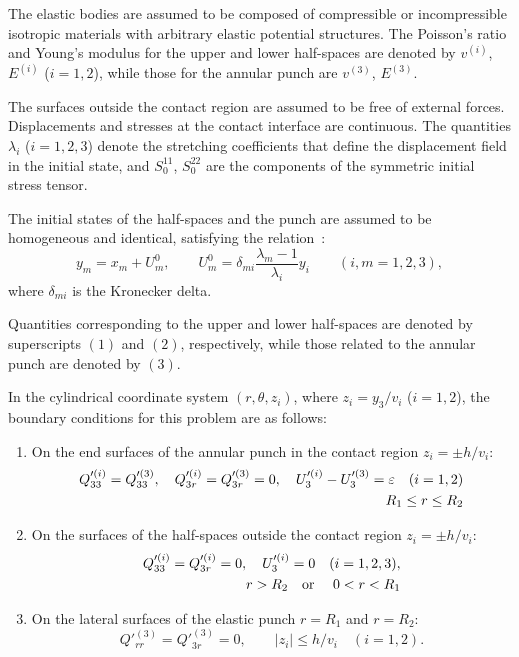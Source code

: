 The elastic bodies are assumed to be composed of compressible or incompressible isotropic materials with arbitrary elastic potential structures. The Poisson's ratio and Young's modulus for the upper and lower half-spaces are denoted by $v^{(i)}$, $E^{(i)}$ ($i=1,2$), while those for the annular punch are $v^{(3)}$, $E^{(3)}$.

The surfaces outside the contact region are assumed to be free of external forces. Displacements and stresses at the contact interface are continuous. The quantities $\lambda_i$ ($i = 1,2,3$) denote the stretching coefficients that define the displacement field in the initial state, and $S_0^{11}$, $S_0^{22}$ are the components of the symmetric initial stress tensor.

The initial states of the half-spaces and the punch are assumed to be homogeneous and identical, satisfying the relation~\cite{YaretskaRef1}:
\begin{equation} \label{YaretskaEq3.1.1}
	y_m = x_m + U_m^0, \qquad U_m^0 = \delta_{mi} \frac{\lambda_m - 1}{\lambda_i} y_i \qquad (i,m = 1,2,3),
\end{equation}
where $\delta_{mi}$ is the Kronecker delta.

Quantities corresponding to the upper and lower half-spaces are denoted by superscripts $(1)$ and $(2)$, respectively, while those related to the annular punch are denoted by $(3)$.

In the cylindrical coordinate system $(r, \theta, z_i)$, where $z_i = y_3 / v_i$ ($i=1,2$), the boundary conditions for this problem are as follows:

\begin{enumerate}
	\item On the end surfaces of the annular punch in the contact region $z_i = \pm h / v_i$:
	\begin{align} 
		Q'^{(i)}_{33} = Q'^{(3)}_{33}, \quad 
		Q'^{(i)}_{3r} = Q'^{(3)}_{3r} = 0, \quad 
		U'^{(i)}_{3} - U'^{(3)}_{3} = \varepsilon \quad (i=1,2)
		\notag \\
		R_1 \le r \le R_2 \label{YaretskaEq3.1.2}
	\end{align}
	
	\item On the surfaces of the half-spaces outside the contact region $z_i = \pm h / v_i$:
	\begin{align} \label{YaretskaEq3.1.3}
		Q'^{(i)}_{33} = Q'^{(i)}_{3r} = 0, \quad U'^{(i)}_{3} = 0 \quad (i=1,2,3),
		\notag \\
		r > R_2 \text{\quad or \quad} 0 < r < R_1
	\end{align}
	
	\item On the lateral surfaces of the elastic punch $r = R_1$ and $r = R_2$:
	\begin{equation} \label{YaretskaEq3.1.4}
		Q'^{(3)}_{rr} = Q'^{(3)}_{3r} = 0, \qquad |z_i| \le h / v_i \quad (i=1,2).
	\end{equation}
\end{enumerate}

